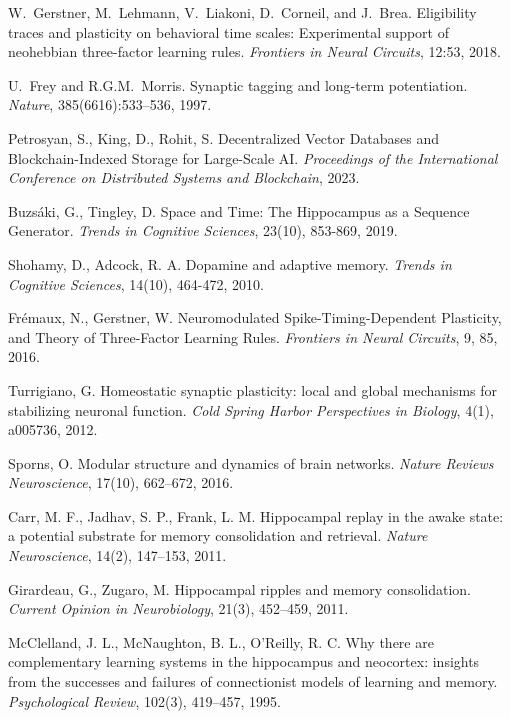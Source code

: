 \documentclass[11pt]{article}
\begin{document}
\begin{thebibliography}{99}
W.~Gerstner, M.~Lehmann, V.~Liakoni, D.~Corneil, and J.~Brea.
\newblock Eligibility traces and plasticity on behavioral time scales: Experimental support of neohebbian three-factor learning rules.
\newblock \emph{Frontiers in Neural Circuits}, 12:53, 2018.

U.~Frey and R.G.M.~Morris.
\newblock Synaptic tagging and long-term potentiation.
\newblock \emph{Nature}, 385(6616):533--536, 1997.

Petrosyan, S., King, D., Rohit, S.
\newblock Decentralized Vector Databases and Blockchain-Indexed Storage for Large-Scale AI.
\newblock \emph{Proceedings of the International Conference on Distributed Systems and Blockchain}, 2023.

Buzsáki, G., Tingley, D.
\newblock Space and Time: The Hippocampus as a Sequence Generator.
\newblock \emph{Trends in Cognitive Sciences}, 23(10), 853-869, 2019.

Shohamy, D., Adcock, R. A.
\newblock Dopamine and adaptive memory.
\newblock \emph{Trends in Cognitive Sciences}, 14(10), 464-472, 2010.

Frémaux, N., Gerstner, W.
\newblock Neuromodulated Spike-Timing-Dependent Plasticity, and Theory of Three-Factor Learning Rules.
\newblock \emph{Frontiers in Neural Circuits}, 9, 85, 2016.

Turrigiano, G.
\newblock Homeostatic synaptic plasticity: local and global mechanisms for stabilizing neuronal function.
\newblock \emph{Cold Spring Harbor Perspectives in Biology}, 4(1), a005736, 2012.

Sporns, O.
\newblock Modular structure and dynamics of brain networks.
\newblock \emph{Nature Reviews Neuroscience}, 17(10), 662–672, 2016.

Carr, M. F., Jadhav, S. P., Frank, L. M.
\newblock Hippocampal replay in the awake state: a potential substrate for memory consolidation and retrieval.
\newblock \emph{Nature Neuroscience}, 14(2), 147–153, 2011.

Girardeau, G., Zugaro, M.
\newblock Hippocampal ripples and memory consolidation.
\newblock \emph{Current Opinion in Neurobiology}, 21(3), 452–459, 2011.

McClelland, J. L., McNaughton, B. L., O'Reilly, R. C.
\newblock Why there are complementary learning systems in the hippocampus and neocortex: insights from the successes and failures of connectionist models of learning and memory.
\newblock \emph{Psychological Review}, 102(3), 419–457, 1995.

\end{thebibliography}
\end{document}
